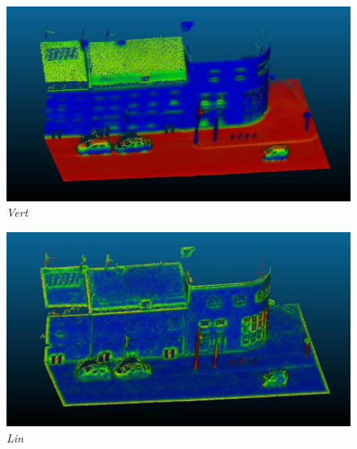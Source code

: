 \documentclass[french]{article}
\begin{document}
\begin{figure}[h]
	\centering
	\begin{minipage}{0.49\linewidth}
		\centering
		\includegraphics[width=\linewidth]{q5-vert.jpg}
		\textit{Vert}
	\end{minipage}\hfill
	\begin{minipage}{0.49\linewidth}
		\centering
		\includegraphics[width=\linewidth]{q5-lin.jpg}
		\textit{Lin}
	\end{minipage}\\


\end{figure}
\end{document}

